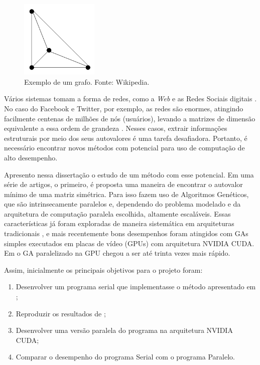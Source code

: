 	\begin{figure}[htbp]
		\centering
			\includegraphics[width=0.33\textwidth]{figs/intro/grafo.PNG}
		\caption{Exemplo de um grafo. Fonte: Wikipedia.}
		\label{fig:grafo}
	\end{figure}
	
	Vários sistemas tomam a forma de redes, como a \emph{Web} e as Redes Sociais digitais \cite{Newman2003}. No caso do Facebook e Twitter, por exemplo, as redes são enormes, atingindo facilmente centenas de milhões de nós (usuários), levando a matrizes de dimensão equivalente a essa ordem de grandeza \cite{twitter2010}. Nesses casos, extrair informações estruturais por meio dos seus autovalores é uma tarefa desafiadora. Portanto, é necessário encontrar novos métodos com potencial para uso de computação de alto desempenho.
	
	Apresento nessa dissertação o estudo de um método com esse potencial. Em uma série de artigos, \cite{metodo2004} o primeiro, é proposta uma maneira de encontrar o autovalor mínimo de uma matriz simétrica. Para isso fazem uso de Algoritmos Genéticos, que são intrinsecamente paralelos \cite{Mitchell98,  Linden2008} e, dependendo do problema modelado e da arquitetura de computação paralela escolhida, altamente escaláveis. Essas características já foram exploradas de maneira sistemática em arquiteturas tradicionais \cite{Cantu-Paz2000}, e mais recentemente bons desempenhos foram atingidos com GAs simples executados em placas de vídeo (GPUs) com arquitetura NVIDIA CUDA. Em \cite{onemaxNaGPU} o GA paralelizado na GPU chegou a ser até trinta vezes mais rápido.

	Assim, inicialmente os principais objetivos para o projeto foram:
	
	\begin{enumerate}
		\item Desenvolver um programa serial que implementasse o método apresentado em \cite{metodo2004};
		
		\item Reproduzir os resultados de \cite{metodo2004};
		
		\item Desenvolver uma versão paralela do programa na arquitetura NVIDIA CUDA;
		
		\item Comparar o desempenho do programa Serial com o programa Paralelo.
	\end{enumerate}
	
